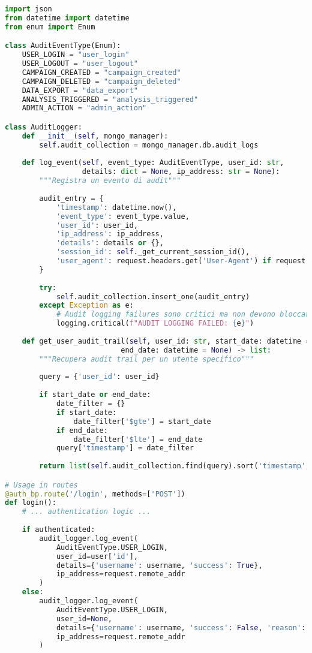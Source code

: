 \documentclass[12pt,a4paper]{report}
\begin{document}
\begin{lstlisting}[language=python, caption=Audit Logging System]
import json
from datetime import datetime
from enum import Enum

class AuditEventType(Enum):
    USER_LOGIN = "user_login"
    USER_LOGOUT = "user_logout"
    CAMPAIGN_CREATED = "campaign_created"
    CAMPAIGN_DELETED = "campaign_deleted"
    DATA_EXPORT = "data_export"
    ANALYSIS_TRIGGERED = "analysis_triggered"
    ADMIN_ACTION = "admin_action"

class AuditLogger:
    def __init__(self, mongo_manager):
        self.audit_collection = mongo_manager.db.audit_logs
    
    def log_event(self, event_type: AuditEventType, user_id: str, 
                  details: dict = None, ip_address: str = None):
        """Registra un evento di audit"""
        
        audit_entry = {
            'timestamp': datetime.now(),
            'event_type': event_type.value,
            'user_id': user_id,
            'ip_address': ip_address,
            'details': details or {},
            'session_id': self._get_current_session_id(),
            'user_agent': request.headers.get('User-Agent') if request else None
        }
        
        try:
            self.audit_collection.insert_one(audit_entry)
        except Exception as e:
            # Audit logging failures sono critici ma non devono bloccare l'app
            logging.critical(f"AUDIT LOGGING FAILED: {e}")
    
    def get_user_audit_trail(self, user_id: str, start_date: datetime = None, 
                           end_date: datetime = None) -> list:
        """Recupera audit trail per un utente specifico"""
        
        query = {'user_id': user_id}
        
        if start_date or end_date:
            date_filter = {}
            if start_date:
                date_filter['$gte'] = start_date
            if end_date:
                date_filter['$lte'] = end_date
            query['timestamp'] = date_filter
        
        return list(self.audit_collection.find(query).sort('timestamp', -1))

# Usage in routes
@auth_bp.route('/login', methods=['POST'])
def login():
    # ... authentication logic ...
    
    if authenticated:
        audit_logger.log_event(
            AuditEventType.USER_LOGIN,
            user_id=user['id'],
            details={'username': username, 'success': True},
            ip_address=request.remote_addr
        )
    else:
        audit_logger.log_event(
            AuditEventType.USER_LOGIN,
            user_id=None,
            details={'username': username, 'success': False, 'reason': 'invalid_credentials'},
            ip_address=request.remote_addr
        )
\end{lstlisting}
\end{document}

